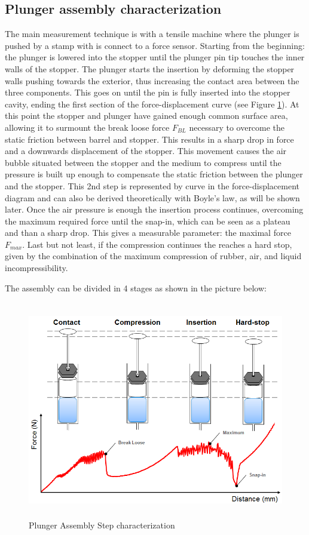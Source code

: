 \subsection{Plunger assembly characterization}
The main measurement technique is with a tensile machine where the plunger is pushed by a stamp with is connect to a force sensor. Starting from the beginning: the plunger is lowered into the stopper until the plunger pin tip touches the inner walls of the stopper. The plunger starts the insertion by deforming the stopper walls pushing towards the exterior, thus increasing the contact area between the three components. This goes on until the pin is fully inserted into the stopper cavity, ending the first section of the force-displacement curve (see Figure \ref{fgr:force}). At this point the stopper and plunger have gained enough common surface area, allowing it to surmount the break loose force $F_{BL}$ necessary to overcome the static friction between barrel and stopper. This results in a sharp drop in force and a downwards displacement of the stopper. This movement causes the air bubble situated between the stopper and the medium to compress until the pressure is built up enough to compensate the static friction between the plunger and the stopper. This 2nd step is represented by curve in the force-displacement diagram and can also be derived theoretically with Boyle's law, as will be shown later. Once the air pressure is enough the insertion process continues, overcoming the maximum required force until the snap-in, which can be seen as a plateau and than a sharp drop. This gives a measurable parameter: the maximal force $F_{max}$.  Last but not least, if the compression continues the reaches a hard stop, given by the combination of the maximum compression of rubber, air, and liquid incompressibility.

The assembly can be divided in 4 stages as shown in the picture below:


\begin{figure}[h!]	
	\centering
\includegraphics[height=9.5cm]{img/force.PNG}
   \caption{Plunger Assembly Step characterization}
 \label{fgr:force}
\end{figure}


